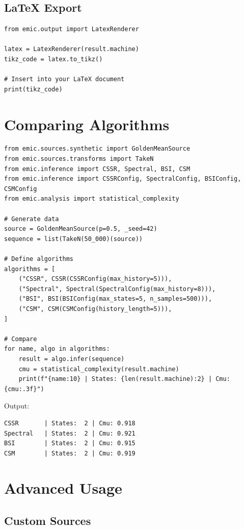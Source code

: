 \documentclass[11pt,a4paper]{report}
\theoremstyle{definition}
\theoremstyle{plain}
\begin{document}
\subsection{LaTeX Export}

\begin{lstlisting}[caption={LaTeX/TikZ export}]
from emic.output import LatexRenderer

latex = LatexRenderer(result.machine)
tikz_code = latex.to_tikz()

# Insert into your LaTeX document
print(tikz_code)
\end{lstlisting}

\section{Comparing Algorithms}

\begin{lstlisting}[caption={Algorithm comparison}]
from emic.sources.synthetic import GoldenMeanSource
from emic.sources.transforms import TakeN
from emic.inference import CSSR, Spectral, BSI, CSM
from emic.inference import CSSRConfig, SpectralConfig, BSIConfig, CSMConfig
from emic.analysis import statistical_complexity

# Generate data
source = GoldenMeanSource(p=0.5, _seed=42)
sequence = list(TakeN(50_000)(source))

# Define algorithms
algorithms = [
    ("CSSR", CSSR(CSSRConfig(max_history=5))),
    ("Spectral", Spectral(SpectralConfig(max_history=8))),
    ("BSI", BSI(BSIConfig(max_states=5, n_samples=500))),
    ("CSM", CSM(CSMConfig(history_length=5))),
]

# Compare
for name, algo in algorithms:
    result = algo.infer(sequence)
    cmu = statistical_complexity(result.machine)
    print(f"{name:10} | States: {len(result.machine):2} | Cmu: {cmu:.3f}")
\end{lstlisting}

Output:
\begin{lstlisting}
CSSR       | States:  2 | Cmu: 0.918
Spectral   | States:  2 | Cmu: 0.921
BSI        | States:  2 | Cmu: 0.915
CSM        | States:  2 | Cmu: 0.919
\end{lstlisting}

\section{Advanced Usage}

\subsection{Custom Sources}
\end{document}
